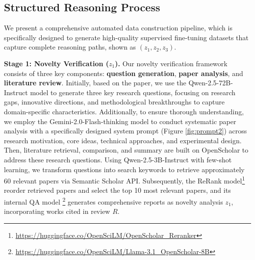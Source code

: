 \documentclass{article}
\begin{document}
\subsection{Structured Reasoning Process}
\label{sec:4.2}
We present a comprehensive automated data construction pipeline, which is specifically designed to generate high-quality supervised fine-tuning datasets that capture complete reasoning paths, shown as $(z_1,z_2,z_3)$.

\textbf{Stage 1: Novelty Verification  ($z_1$).}
Our novelty verification framework consists of three key components: \textbf{question generation}, \textbf{paper analysis}, and \textbf{literature review}. Initially, based on the paper, we use the Qwen-2.5-72B-Instruct model \citep{qwen2025qwen25technicalreport} to generate three key research questions, focusing on research gaps, innovative directions, and methodological breakthroughs to capture domain-specific characteristics. Additionally, to ensure thorough understanding, we employ the Gemini-2.0-Flash-thinking model to conduct systematic paper analysis with a specifically designed system prompt (Figure \ref{fig:prompt2}) across research motivation, core ideas, technical approaches, and experimental design. Then, literature retrieval, comparison, and summary are built on OpenScholar \cite{asai2024openscholarsynthesizingscientificliterature} to address these research questions. Using Qwen-2.5-3B-Instruct with few-shot learning, we transform questions into search keywords to retrieve approximately 60 relevant papers via Semantic Scholar API. Subsequently, the ReRank model\footnote{\url{https://huggingface.co/OpenSciLM/OpenScholar_Reranker}} reorder retrieved papers and select the top 10 most relevant papers, and its internal QA model \footnote{\url{https://huggingface.co/OpenSciLM/Llama-3.1_OpenScholar-8B}} generates comprehensive reports as novelty analysis $z_1$, incorporating works cited in review $R$.


\end{document}
